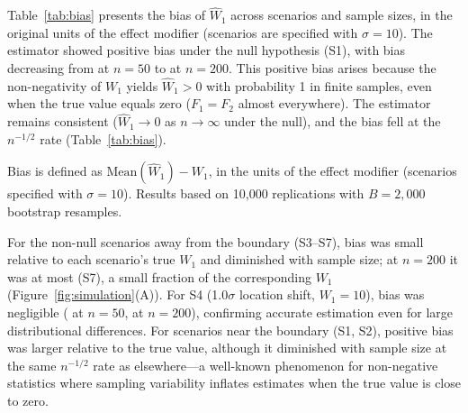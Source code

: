 \documentclass[AMA,Times1COL]{WileyNJDv5}
\begin{document}
Table~\ref{tab:bias} presents the bias of $\widehat{W}_1$ across scenarios and sample sizes, in the original units of the effect modifier (scenarios are specified with $\sigma = 10$). The estimator showed positive bias under the null hypothesis (S1), with bias decreasing from  at $n=50$ to  at $n=200$. This positive bias arises because the non-negativity of $W_1$ yields $\widehat{W}_1 > 0$ with probability 1 in finite samples, even when the true value equals zero ($F_1 = F_2$ almost everywhere). The estimator remains consistent ($\widehat{W}_1 \to 0$ as $n \to \infty$ under the null), and the bias fell at the $n^{-1/2}$ rate (Table~\ref{tab:bias}).

\begin{table}[ht]
\centering
\caption{Bias of $\widehat{W}_1$ by scenario and sample size, in the original units of the effect modifier.\label{tab:bias}}
\begin{tablenotes}
\item Bias is defined as $\text{Mean}(\widehat{W}_1) - W_1$, in the units of the effect modifier (scenarios specified with $\sigma = 10$). Results based on 10{,}000 replications with $B = 2{,}000$ bootstrap resamples.
\end{tablenotes}
\end{table}

For the non-null scenarios away from the boundary (S3--S7), bias was small relative to each scenario's true $W_1$ and diminished with sample size; at $n = 200$ it was at most  (S7), a small fraction of the corresponding $W_1$ (Figure~\ref{fig:simulation}(A)). For S4 (1.0$\sigma$ location shift, $W_1 = 10$), bias was negligible ( at $n=50$,  at $n=200$), confirming accurate estimation even for large distributional differences. For scenarios near the boundary (S1, S2), positive bias was larger relative to the true value, although it diminished with sample size at the same $n^{-1/2}$ rate as elsewhere---a well-known phenomenon for non-negative statistics where sampling variability inflates estimates when the true value is close to zero.
\end{document}
